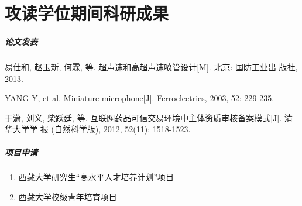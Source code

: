
\chapter{攻读学位期间科研成果}



\paragraph{论文发表}
\begin{publications}
	\item
	易仕和, 赵玉新, 何霖, 等. 超声速和高超声速喷管设计[M]. 北京: 国防工业出
	版社, 2013.
	\item 
	YANG Y, et al. Miniature microphone[J]. Ferroelectrics, 2003, 52: 229-235.
	\item 
	于潇, 刘义, 柴跃廷, 等. 互联网药品可信交易环境中主体资质审核备案模式[J]. 清华大学学
	报 (自然科学版), 2012, 52(11): 1518-1523.
	
	
\end{publications}
\paragraph{项目申请}
\begin{enumerate}
	\item
	西藏大学研究生“高水平人才培养计划”项目
	\item 
	西藏大学校级青年培育项目
\end{enumerate}
